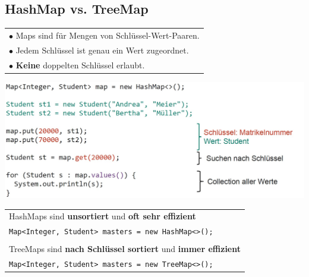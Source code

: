 {\subsection{HashMap vs. TreeMap}
    \begin{tabular}{l}
        $\bullet$ Maps sind für Mengen von Schlüssel-Wert-Paaren.\\
        $\bullet$ Jedem Schlüssel ist genau ein Wert zugeordnet.\\
        $\bullet$ \textbf{Keine} doppelten Schlüssel erlaubt. \\
    \end{tabular}

    \begin{center}
        \includegraphics[width=0.85\linewidth]{pictures/map-beispiel.jpg}
    \end{center}

    \begin{tabular}{l}
        HashMaps sind \textbf{unsortiert} und \textbf{oft sehr effizient}\\
        \verb|Map<Integer, Student> masters = new HashMap<>();|\\
        \\   
        TreeMaps sind \textbf{nach Schlüssel sortiert} und \textbf{immer effizient}\\
        \verb|Map<Integer, Student> masters = new TreeMap<>();|\\
    \end{tabular}
    
    \columnbreak

}
